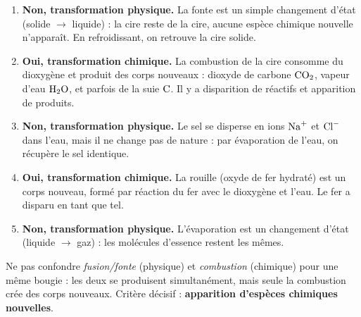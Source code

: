 \documentclass[11pt]{article}
\begin{document}
\begin{corrige}
\begin{enumerate}
    \item \textbf{Non, transformation physique.} La fonte est un simple changement d'état (solide $\to$ liquide) : la cire reste de la cire, aucune espèce chimique nouvelle n'apparaît. En refroidissant, on retrouve la cire solide.
    \item \textbf{Oui, transformation chimique.} La combustion de la cire consomme du dioxygène et produit des corps nouveaux : dioxyde de carbone $\ce{CO2}$, vapeur d'eau $\ce{H2O}$, et parfois de la suie $\ce{C}$. Il y a disparition de réactifs et apparition de produits.
    \item \textbf{Non, transformation physique.} Le sel se disperse en ions $\ce{Na+}$ et $\ce{Cl-}$ dans l'eau, mais il ne change pas de nature : par évaporation de l'eau, on récupère le sel identique.
    \item \textbf{Oui, transformation chimique.} La rouille (oxyde de fer hydraté) est un corps nouveau, formé par réaction du fer avec le dioxygène et l'eau. Le fer a disparu en tant que tel.
    \item \textbf{Non, transformation physique.} L'évaporation est un changement d'état (liquide $\to$ gaz) : les molécules d'essence restent les mêmes.
\end{enumerate}
\end{corrige}

\begin{attention}
Ne pas confondre \emph{fusion/fonte} (physique) et \emph{combustion} (chimique) pour une même bougie : les deux se produisent simultanément, mais seule la combustion crée des corps nouveaux. Critère décisif : \textbf{apparition d'espèces chimiques nouvelles}.
\end{attention}
\end{document}
